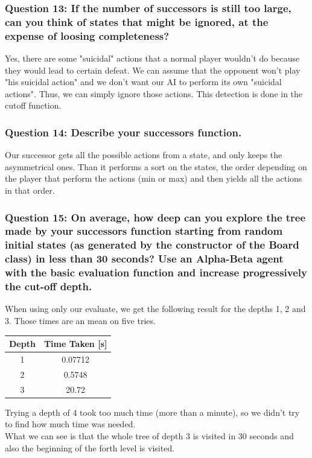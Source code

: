 \documentclass[a4paper,10pt]{article}
\begin{document}
				\subsubsection{Question 13: If the number of successors is still too large, can you think of states that might be ignored, at the expense of loosing completeness?}
					Yes, there are some "suicidal" actions that a normal player wouldn't do because they would lead to certain defeat. We can assume that the opponent won't play "his suicidal action" and we don't want our AI to perform its own "suicidal actions". Thus, we can simply ignore those actions. This detection is done in the cutoff function.
				\subsubsection{Question 14: Describe your successors function.}
					Our successor gets all the possible actions from a state, and only keeps the asymmetrical ones. Than it performs a sort on the states, the order depending on the player that perform the actions (min or max) and then yields all the actions in that order.
				\subsubsection{Question 15: On average, how deep can you explore the tree made by your successors function starting from random initial states (as generated by the constructor of the Board class) in less than 30 seconds? Use an Alpha-Beta agent with the basic evaluation function and increase progressively the cut-off depth.}
					When using only our evaluate, we get the following result for the depths 1, 2 and 3. Those times are an mean on five tries.
					\begin{center}
						\begin{tabular}{|c|c|}
						\hline 
						Depth & Time Taken [s] \\ 
						\hline 
						1 & 0.07712 \\ 
						\hline 
						2 & 0.5748 \\ 
						\hline 
						3 & 20.72 \\ 
						\hline 
						\end{tabular} 
					\end{center}
					Trying a depth of 4 took too much time (more than a minute), so we didn't try to find how much time was needed.\\
					What we can see is that the whole tree of depth 3 is visited in 30 seconds and also the beginning of the forth level is visited.
				
\end{document}

